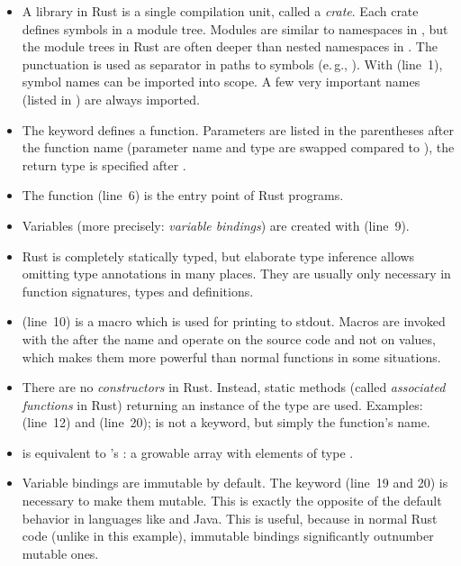 \vspace{-2mm}
\begin{itemize}
  \item A library in Rust is a single compilation unit, called a \emph{crate}.
  Each crate defines symbols in a module tree.
  Modules are similar to namespaces in \cpp, but the module trees in Rust are often deeper than nested namespaces in \cpp.
  The punctuation \code{::} is used as separator in paths to symbols (e.\,g., ).
  With  (line~1), symbol names can be imported into scope.
  A few very important names (listed in ) are always imported.
  \item The keyword  defines a function.
  Parameters are listed in the parentheses after the function name (parameter name and type are swapped compared to \cpp), the return type is specified after \code{->}.
  \item The  function (line~6) is the entry point of Rust programs.
  \item Variables (more precisely: \emph{variable bindings}) are created with  (line~9).
  \item Rust is completely statically typed, but elaborate type inference allows omitting type annotations in many places.
  They are usually only necessary in function signatures, types and  definitions.
  \item {} (line~10) is a macro which is used for printing to stdout.
  Macros are invoked with the \code{!} after the name and operate on the source code and not on values, which makes them more powerful than normal functions in some situations.
  \item There are no \emph{constructors} in Rust.
  Instead, static methods (called \emph{associated functions} in Rust) returning an instance of the type are used.
  Examples:  (line~12) and   (line~20);  is not a keyword, but simply the function's name.
  \item {} is equivalent to \cpp's : a growable array with elements of type .
  \item Variable bindings are immutable by default.
  The keyword  (line~19 and 20) is necessary to make them mutable.
  This is exactly the opposite of the default behavior in languages like \cpp and Java.
  This is useful, because in normal Rust code (unlike in this example), immutable bindings significantly outnumber mutable ones.

\end{itemize}
